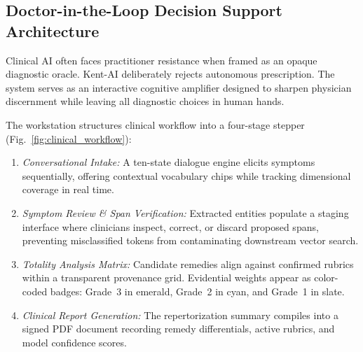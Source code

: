 \subsection{Doctor-in-the-Loop Decision Support Architecture}

Clinical AI often faces practitioner resistance when framed as an opaque diagnostic oracle. Kent-AI deliberately rejects autonomous prescription. The system serves as an interactive cognitive amplifier designed to sharpen physician discernment while leaving all diagnostic choices in human hands.

The workstation structures clinical workflow into a four-stage stepper (Fig.~\ref{fig:clinical_workflow}):
\begin{enumerate}
    \item \textit{Conversational Intake:} A ten-state dialogue engine elicits symptoms sequentially, offering contextual vocabulary chips while tracking dimensional coverage in real time.
    \item \textit{Symptom Review \& Span Verification:} Extracted entities populate a staging interface where clinicians inspect, correct, or discard proposed spans, preventing misclassified tokens from contaminating downstream vector search.
    \item \textit{Totality Analysis Matrix:} Candidate remedies align against confirmed rubrics within a transparent provenance grid. Evidential weights appear as color-coded badges: Grade~3 in emerald, Grade~2 in cyan, and Grade~1 in slate.
    \item \textit{Clinical Report Generation:} The repertorization summary compiles into a signed PDF document recording remedy differentials, active rubrics, and model confidence scores.
\end{enumerate}

